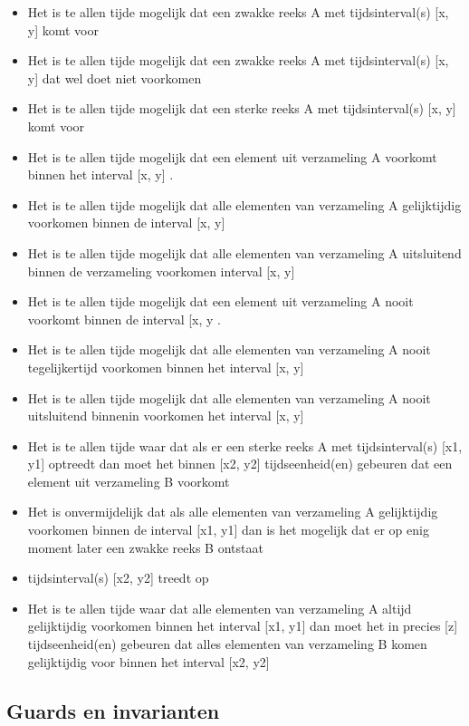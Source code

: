 \documentclass{article}
\begin{document}
	\begin{itemize}
		\item Het is te allen tijde mogelijk dat een zwakke reeks A met tijdsinterval(s) [x, y]
		komt voor
		\item Het is te allen tijde mogelijk dat een zwakke reeks A met tijdsinterval(s) [x, y] dat wel doet
		niet voorkomen
		\item Het is te allen tijde mogelijk dat een sterke reeks A met tijdsinterval(s) [x, y]
		komt voor
		\item Het is te allen tijde mogelijk dat een element uit verzameling A voorkomt binnen het interval [x, y]
		.
		\item  Het is te allen tijde mogelijk dat alle elementen van verzameling A gelijktijdig voorkomen binnen de
		interval [x, y]
		\item Het is te allen tijde mogelijk dat alle elementen van verzameling A uitsluitend binnen de verzameling voorkomen
		interval [x, y]
		\item Het is te allen tijde mogelijk dat een element uit verzameling A nooit voorkomt binnen de
		interval [x, y
		.
		\item  Het is te allen tijde mogelijk dat alle elementen van verzameling A nooit tegelijkertijd voorkomen
		binnen het interval [x, y]
		\item Het is te allen tijde mogelijk dat alle elementen van verzameling A nooit uitsluitend binnenin voorkomen
		het interval [x, y]
		\item Het is te allen tijde waar dat als er een sterke reeks A met tijdsinterval(s) [x1, y1] optreedt
		dan moet het binnen [x2, y2] tijdseenheid(en) gebeuren dat een element uit verzameling B voorkomt
		\item Het is onvermijdelijk dat als alle elementen van verzameling A gelijktijdig voorkomen binnen de
		interval [x1, y1] dan is het mogelijk dat er op enig moment later een zwakke reeks B ontstaat
		\item tijdsinterval(s) [x2, y2] treedt op
		\item  Het is te allen tijde waar dat alle elementen van verzameling A altijd gelijktijdig voorkomen
		binnen het interval [x1, y1] dan moet het in precies [z] tijdseenheid(en) gebeuren dat alles
		elementen van verzameling B komen gelijktijdig voor binnen het interval [x2, y2]
		
	\end{itemize}
	
	\subsection{Guards en invarianten}
	
\end{document}
